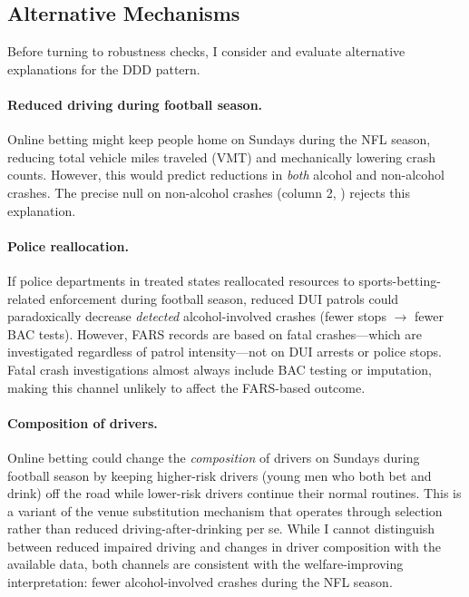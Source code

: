 \documentclass[12pt]{article}
\begin{document}
\subsection{Alternative Mechanisms}

Before turning to robustness checks, I consider and evaluate alternative explanations for the DDD pattern.

\paragraph{Reduced driving during football season.} Online betting might keep people home on Sundays during the NFL season, reducing total vehicle miles traveled (VMT) and mechanically lowering crash counts. However, this would predict reductions in \emph{both} alcohol and non-alcohol crashes. The precise null on non-alcohol crashes (column 2, ) rejects this explanation.

\paragraph{Police reallocation.} If police departments in treated states reallocated resources to sports-betting-related enforcement during football season, reduced DUI patrols could paradoxically decrease \emph{detected} alcohol-involved crashes (fewer stops $\rightarrow$ fewer BAC tests). However, FARS records are based on fatal crashes---which are investigated regardless of patrol intensity---not on DUI arrests or police stops. Fatal crash investigations almost always include BAC testing or imputation, making this channel unlikely to affect the FARS-based outcome.

\paragraph{Composition of drivers.} Online betting could change the \emph{composition} of drivers on Sundays during football season by keeping higher-risk drivers (young men who both bet and drink) off the road while lower-risk drivers continue their normal routines. This is a variant of the venue substitution mechanism that operates through selection rather than reduced driving-after-drinking per se. While I cannot distinguish between reduced impaired driving and changes in driver composition with the available data, both channels are consistent with the welfare-improving interpretation: fewer alcohol-involved crashes during the NFL season.
\end{document}

